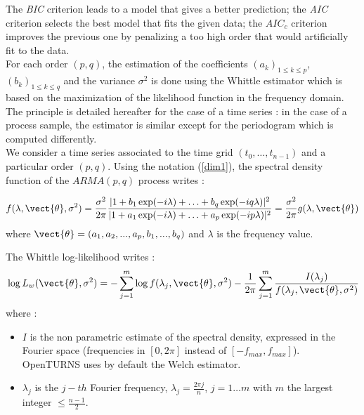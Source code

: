 The \textit{BIC} criterion leads to a model that gives a better prediction; the \textit{AIC} criterion selects the best model that fits the given data; the $AIC_c$ criterion improves the previous one by penalizing a too high order that would artificially fit to the data.\\

For each order $(p,q)$, the estimation of the coefficients $(a_k)_{1\leq k\leq p}$, $(b_k)_{1\leq k\leq q}$ and the variance $\sigma^2$ is done using the Whittle estimator which is based on the maximization of the likelihood function in the frequency domain.  \\
The principle is detailed hereafter for the case of a time series : in the case of a process sample, the estimator is similar except for the periodogram which is computed differently. \\

We consider a time series associated to the time grid $(t_0, \hdots, t_{n-1})$ and a particular order $(p,q)$. Using the notation (\ref{dim1}), the spectral density function of the $ARMA(p,q)$ process writes :

\begin{equation}{\label{arma_spectrum}}
  f(\lambda, \vect{\theta}, \sigma^2) = \frac{\sigma^2}{2 \pi} \frac{|1 + b_1 \exp(-i \lambda) + \ldots + b_q \exp(-i q \lambda)|^2}{|1 + a_1 \exp(-i \lambda) + \ldots + a_p \exp(-i p \lambda)|^2} = \frac{\sigma^2}{2 \pi} g(\lambda, \vect{\theta})
\end{equation}
where $\vect{\theta} = (a_1, a_2,...,a_p,b_1,...,b_q)$ and $\lambda$ is the frequency value.


The Whittle log-likelihood writes :
\begin{equation}{\label{arma_likelihood}}
  \log L_w(\vect{\theta}, \sigma^2) = - \sum_{j=1}^{m} \log f(\lambda_j,  \vect{\theta}, \sigma^2) - \frac{1}{2 \pi} \sum_{j=1}^{m} \frac{I(\lambda_j)}{f(\lambda_j,  \vect{\theta}, \sigma^2)}
\end{equation}
where :
\begin{itemize}
\item $I$ is the non parametric estimate of the spectral density, expressed in the Fourier space (frequencies in $[0,2\pi]$ instead of $[-f_{max}, f_{max}]$). OpenTURNS uses by default the Welch estimator.
\item $\lambda_j$ is the $j-th$ Fourier frequency, $\lambda_j = \frac{2 \pi j}{n}$, $j=1 \ldots m$ with $m$ the largest integer  $\leq \frac{n-1}{2}$.
\end{itemize}

